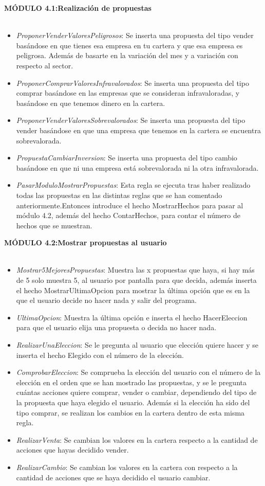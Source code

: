 \textbf{MÓDULO 4.1:Realización de propuestas}\\\\
\begin{itemize}
	\item \textit{ProponerVenderValoresPeligrosos}: Se inserta una propuesta del tipo vender basándose en que tienes esa empresa en tu cartera y que esa empresa es peligrosa. Además de basarte en la variación del mes y a variación con respecto al sector.
	\item \textit{ProponerComprarValoresInfravalorados}: Se inserta una propuesta del tipo comprar basándose en las empresas que se consideran infravaloradas, y basándose en que tenemos dinero en la cartera.
	\item \textit{ProponerVenderValoresSobrevalorados}: Se inserta una propuesta del tipo vender basándose en que una empresa que tenemos en la cartera se encuentra sobrevalorada.
	\item \textit{PropuestaCambiarInversion}: Se inserta una propuesta del tipo cambio basándose en que ni una empresa está sobrevalorada ni la otra infravalorada.
	\item \textit{PasarModuloMostrarPropuestas}:  Esta regla se ejecuta tras haber realizado todas las propuestas en las distintas reglas que se han comentado anteriormente.Entonces introduce el hecho MostrarHechos para pasar al módulo 4.2, además del hecho ContarHechos, para contar el número de hechos que se muestran.\\
\end{itemize}
\textbf{MÓDULO 4.2:Mostrar propuestas al usuario}\\\\
\begin{itemize}
	\item \textit{Mostrar5MejoresPropuestas}: Muestra las x propuestas que haya, si hay más de 5 solo muestra 5, al usuario por pantalla para que decida, además inserta el hecho MostrarUltimaOpcion para mostrar la última opción que es en la que el usuario decide no hacer nada y salir del programa.
	\item \textit{UltimaOpcion}: Muestra la última opción e inserta el hecho HacerEleccion para que el usuario elija una propuesta o decida no hacer nada.
	\item \textit{RealizarUnaEleccion}: Se le pregunta al usuario que elección quiere hacer y se inserta el hecho Elegido con el número de la elección.
	\item \textit{ComprobarEleccion}: Se comprueba la elección del usuario con el número de la elección en el orden que se han mostrado las propuestas, y se le pregunta cuántas acciones quiere comprar, vender o cambiar, dependiendo del tipo de la propuesta que haya elegido el usuario. Además si la elección ha sido del tipo comprar, se realizan los cambios en la cartera dentro de esta misma regla.
	\item \textit{RealizarVenta}: Se cambian los valores en la cartera respecto a la cantidad de acciones que hayas decidido vender.
	\item \textit{RealizarCambio}: Se cambian los valores en la cartera con respecto a la cantidad de acciones que se haya decidido el usuario cambiar.
\end{itemize}
